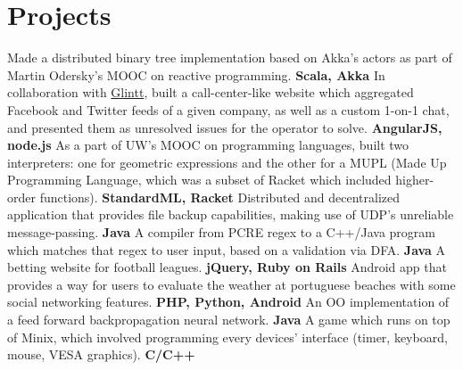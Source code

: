 \documentclass[11pt,a4paper]{moderncv}
\begin{document}
\section{Projects}
{Made a distributed binary tree implementation based on Akka's actors as part of Martin Odersky's MOOC on reactive programming. \textbf{Scala, Akka}}
{In collaboration with \href{http://www.glintt.com/}{Glintt}, built a call-center-like website which aggregated Facebook and Twitter feeds of a given company, as well as a custom 1-on-1 chat, and presented them as unresolved issues for the operator to solve.  \textbf{AngularJS, node.js}}
{As a part of UW's MOOC on programming languages, built two interpreters: one for geometric expressions and the other for a MUPL (Made Up Programming Language, which was a subset of Racket which included higher-order functions). \textbf{StandardML, Racket}}
{Distributed and decentralized application that provides file backup capabilities, making use of UDP's unreliable message-passing. \textbf{Java}}
{A compiler from PCRE regex to a C++/Java program which matches that regex to user input, based on a validation via DFA. \textbf{Java}}
{A betting website for football leagues. \textbf{jQuery, Ruby on Rails}}
{Android app that provides a way for users to evaluate the weather at portuguese beaches with some social networking features. \textbf{PHP, Python, Android}}
{An OO implementation of a feed forward backpropagation neural network. \textbf{Java}}
{A game which runs on top of Minix, which involved programming every devices' interface (timer, keyboard, mouse, VESA graphics). \textbf{C/C++}}

\end{document}
